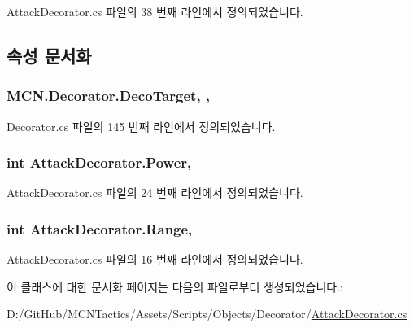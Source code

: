 Attack\+Decorator.\+cs 파일의 38 번째 라인에서 정의되었습니다.



\subsection{속성 문서화}
\subsubsection[{\texorpdfstring{Deco\+Target}{DecoTarget}}]{ M\+C\+N.\+Decorator.\+Deco\+Target\hspace{0.3cm}{\ttfamily [get]}, {\ttfamily [protected]}, {\ttfamily [inherited]}}\hypertarget{class_m_c_n_1_1_decorator_a1306a0a8b814650cd5970a1ffc7ba2fe}{}\label{class_m_c_n_1_1_decorator_a1306a0a8b814650cd5970a1ffc7ba2fe}


Decorator.\+cs 파일의 145 번째 라인에서 정의되었습니다.

\subsubsection[{\texorpdfstring{Power}{Power}}]{\setlength{\rightskip}{0pt plus 5cm}int Attack\+Decorator.\+Power\hspace{0.3cm}{\ttfamily [get]}, {\ttfamily [private]}}\hypertarget{class_attack_decorator_a3305d359c9c0faaf4f12aa261492ee7c}{}\label{class_attack_decorator_a3305d359c9c0faaf4f12aa261492ee7c}


Attack\+Decorator.\+cs 파일의 24 번째 라인에서 정의되었습니다.

\subsubsection[{\texorpdfstring{Range}{Range}}]{\setlength{\rightskip}{0pt plus 5cm}int Attack\+Decorator.\+Range\hspace{0.3cm}{\ttfamily [get]}, {\ttfamily [private]}}\hypertarget{class_attack_decorator_ad025c4d20cc5dba4326ecbd52562a3c4}{}\label{class_attack_decorator_ad025c4d20cc5dba4326ecbd52562a3c4}


Attack\+Decorator.\+cs 파일의 16 번째 라인에서 정의되었습니다.



이 클래스에 대한 문서화 페이지는 다음의 파일로부터 생성되었습니다.\+:\begin{DoxyCompactItemize}
\item 
D\+:/\+Git\+Hub/\+M\+C\+N\+Tactics/\+Assets/\+Scripts/\+Objects/\+Decorator/\hyperlink{_attack_decorator_8cs}{Attack\+Decorator.\+cs}\end{DoxyCompactItemize}

